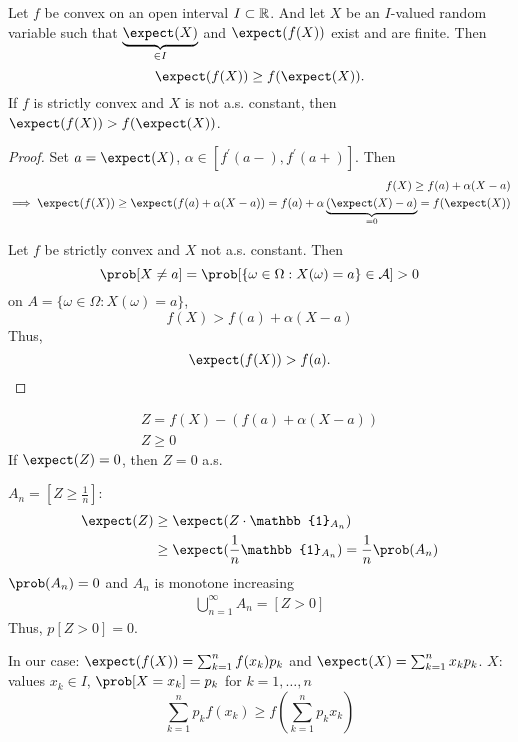 \documentclass[mfit.tex]{subfiles}
\begin{document}
\begin{theorem}
  Let $f$ be convex on an open interval $I \subset \mathbb{R}$. And let $X$ be an $I$-valued random variable such that 
  $\underbrace{\expect(X)}_{\in I}$ and $\expect(f(X))$ exist and are finite.
  Then
  \[ \expect(f(X)) \geq f(\expect(X)) \text{.} \]
  If $f$ is strictly convex and $X$ is not a.s. constant, then $\expect(f(X)) > f(\expect(X))$.
\end{theorem}

\begin{proof}
  Set $a = \expect(X)$, $\alpha \in [f^\prime(a-),f^\prime(a+)]$.
  Then
  \begin{align*}
    f(X) \geq f(a) + \alpha (X - a)  \\
    \implies \expect(f(X)) \geq \expect(f(a) + \alpha (X-a)) = f(a) + \alpha \underbrace{(\expect(X)-a)}_{=0} = f(\expect(X))
  \end{align*}
  
  Let $f$ be strictly convex and $X$ not a.s. constant.
  Then 
  \[ \prob[X \neq a] = \prob[\{\omega \in \Omega: X(\omega) = a\} \in \mathcal{A}] > 0 \]
  on $A = \{\omega \in \Omega: X(\omega) = a\}$,
  \[ f(X) > f(a) + \alpha (X-a) \]
  Thus,
  \[ \expect(f(X)) > f(a) \text{.} \]
\end{proof}

\begin{rem}
  \begin{align*}
    Z = f(X) - (f(a)+\alpha (X-a)) \\
    Z \geq 0
  \end{align*}
  If $\expect(Z) = 0$, then $Z = 0$ a.s.
\end{rem}

\begin{ex}
  $A_n = [ Z \geq \frac{1}{n}]$:
  \begin{align*}
    \expect(Z) &\geq \expect(Z \cdot \mathbb{1}_{A_n}) \\
    &\geq \expect(\frac{1}{n} \mathbb{1}_{A_n}) = \frac{1}{n} \prob(A_n)
  \end{align*}
  $\prob(A_n) = 0$ and $A_n$ is monotone increasing
  \begin{align*}
    \bigcup_{n=1}^\infty A_n = [Z > 0]
  \end{align*}
  Thus, $p[Z > 0] = 0$.
\end{ex}

In our case: $\expect(f(X)) = \sum_{k=1}^n f(x_k) p_k$ and $\expect(X) = \sum_{k=1}^n x_k p_k$.
$X$: values $x_k \in I$, $\prob[X = x_k] = p_k$ for $k=1,\dots,n$
\[ \sum_{k=1}^n p_k f(x_k) \geq f(\sum_{k=1}^n p_k x_k) \]
\end{document}
